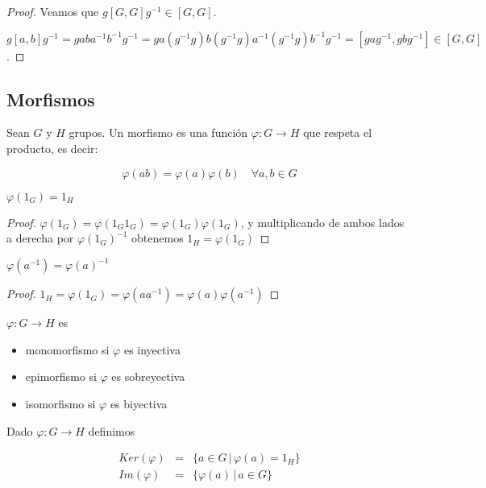 \begin{proof}
Veamos que $g[G,G]g^{-1} \in [G,G]$.

$g[a,b]g^{-1} = gaba^{-1}b^{-1}g^{-1} = ga(g^{-1}g)b(g^{-1}g)a^{-1}(g^{-1}g)b^{-1}g^{-1} = [gag^{-1},gbg^{-1}] \in [G,G]$.
\end{proof}

\subsection{Morfismos}

\begin{defn}
Sean $G$ y $H$ grupos. Un morfismo es una funci\'on $\varphi: G \rightarrow H$ que respeta el producto, es decir:

$$\varphi(ab) = \varphi(a) \varphi(b) \quad \forall a,b \in G$$
\end{defn}

\begin{obs}
$\varphi(1_G) = 1_H$
\end{obs}

\begin{proof}
$\varphi(1_G) = \varphi(1_G1_G) = \varphi(1_G) \varphi(1_G)$, y multiplicando de ambos lados a derecha por $\varphi(1_G)^{-1}$ obtenemos $1_H = \varphi(1_G)$
\end{proof}

\begin{obs}
$\varphi(a^{-1}) = \varphi(a)^{-1}$
\end{obs}

\begin{proof}
$1_H = \varphi(1_G) = \varphi(aa^{-1}) = \varphi(a) \varphi(a^{-1})$
\end{proof}

\begin{defn}
$\varphi: G \rightarrow H$ es
\begin{itemize}
\item monomorfismo si $\varphi$ es inyectiva
\item epimorfismo si $\varphi$ es sobreyectiva
\item isomorfismo si $\varphi$ es biyectiva
\end{itemize}
\end{defn}

\begin{defn}
Dado $\varphi: G \rightarrow H$ definimos 

\begin{eqnarray*}
Ker(\varphi) &=& \{a \in G \, |\, \varphi(a) = 1_H\}\\
Im(\varphi) &=& \{\varphi(a) \,| \, a \in G\}
\end{eqnarray*}
\end{defn}

